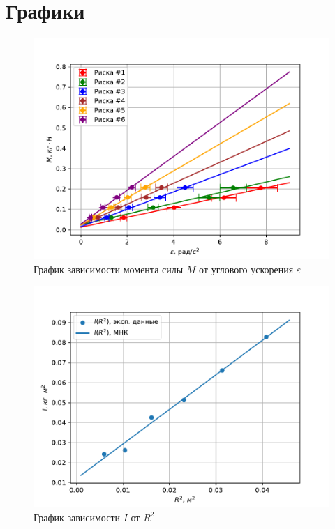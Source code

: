 \newpage
\section{Графики}
\begin{figure}[ht]
    \centering
    \includegraphics[width=\textwidth]{img/eps_moment.pdf}
    \caption{График зависимости момента силы $M$ от углового ускорения $\varepsilon$}
\end{figure}

\begin{figure}[ht]
    \centering
    \includegraphics[width=\textwidth]{img/i_r_squared.pdf}
    \caption{График зависимости $I$ от $R^2$}
\end{figure}
\newpage
